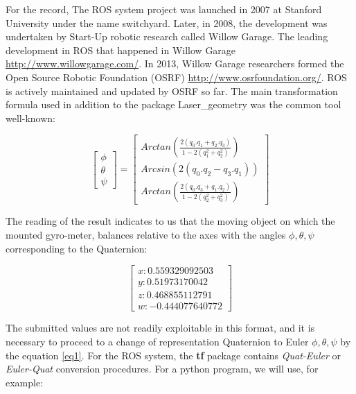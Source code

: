 \documentclass[Afour,sageh,times]{sagej}
\begin{document}
For the record, The ROS system project was launched in 2007 at Stanford University under the name switchyard. Later, in 2008, the development was undertaken by Start-Up robotic research called Willow Garage. The leading development in ROS that happened in Willow Garage \url{http://www.willowgarage.com/}. In 2013, Willow Garage researchers formed the Open Source Robotic Foundation (OSRF) \url{http://www.osrfoundation.org/}. ROS is actively maintained and updated by OSRF so far.
The main transformation formula used in addition to the package Laser\_geometry was the common tool well-known:

\begin{equation} \label{eq1}
\begin{bmatrix}
\phi \\ \theta \\ \psi 
\end{bmatrix}=
    \begin{bmatrix}
        Arctan(\frac{2(q_0.q_1+q_2.q_3)}{1-2(q_1^2+q_2^2)})\\
        Arcsin\left(2(q_0.q_2-q_3.q_1) \right)\\
        Arctan(\frac{2(q_0.q_3+q_1.q_2)}{1-2(q_2^2+q_3^2)})
    \end{bmatrix}
\end{equation}

The reading of the result indicates to us that the moving object on which the mounted gyro-meter, balances relative to the axes with the angles $\phi, \theta, \psi$ corresponding to the Quaternion:

\begin{equation}\label{eq2}
\begin{bmatrix}
  x: 0.559329092503\\
  y: 0.51973170042\\
  z: 0.468855112791\\
  w: -0.444077640772
\end{bmatrix}
\end{equation}

The submitted values are not readily exploitable in this format, and it is necessary to proceed to a change of representation Quaternion to Euler $\phi, \theta, \psi$ by the equation \ref{eq1}.\newline
For the ROS system, the \textbf{tf} package contains \textit{Quat-Euler} or \textit{Euler-Quat} conversion procedures. For a python program, we will use, for example:
\end{document}
